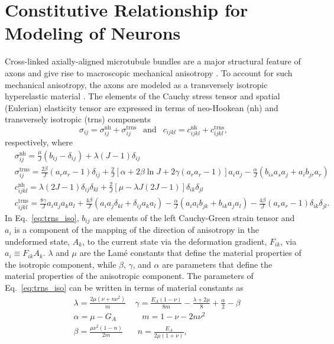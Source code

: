 \documentclass[]{interact}
\begin{document}
\section{Constitutive Relationship for Modeling of Neurons}
Cross-linked axially-aligned microtubule bundles are a major structural feature of axons and give rise to macroscopic mechanical anisotropy \citep{Peter:2012fc}. To account for such mechanical anisotropy, the axons are modeled as a transversely isotropic hyperelastic material \citep{Bonet:1998vc,JavierBonet:2008uxa}. The elements of the Cauchy stress tensor and spatial (Eulerian) elasticity tensor are expressed in terms of neo-Hookean (nh) and transversely isotropic (trns) components \citep{Bonet:1998vc}
%
\begin{equation}
\sigma_{ij} = \sigma^{\text{nh}}_{ij} + \sigma^{\text{trns}}_{ij} \ \ \text{ and } \ \ c_{ijkl} = c^{\text{nh}}_{ijkl} + c^{\text{trns}}_{ijkl},
\end{equation}
%
respectively, where 
%
\begin{align}
&\sigma^{\text{nh}}_{ij} = \frac{\mu}{J}(b_{ij} - \delta_{ij}) + \lambda(J-1)\delta_{ij} \nonumber\\
%
&\sigma^{\text{trns}}_{ij} = \frac{2\beta}{J}(a_r a_r - 1)\delta_{ij} + \frac{2}{J}[\alpha+2\beta\ln J+2\gamma(a_r a_r -1)]a_i a_j - \frac{\alpha}{J}(b_{is}a_s a_j+a_i b_{jr}a_r) \nonumber\\
%
&c^{\text{nh}}_{ijkl} = \lambda(2J-1)\delta_{ij}\delta_{kl} + \frac{2}{J}[\mu - \lambda J(2J-1)]\delta_{ik}\delta_{jl} \nonumber\\
%
&c^{\text{trns}}_{ijkl} = \frac{8\gamma}{J}a_i a_j a_k a_l + \frac{4\beta}{J}(a_i a_j \delta_{kl} + \delta_{ij}a_k a_l) - \frac{\alpha}{J}(a_i a_l b_{jk} + b_{ik}a_j a_l) - \frac{4\beta}{J}(a_r a_r - 1)\delta_{ik}\delta_{jl}.
\label{eq:trns_iso}
\end{align}
%
In Eq.\ \eqref{eq:trns_iso}, $b_{ij}$ are elements of the left Cauchy-Green strain tensor and $a_i$ is a component of the mapping of the direction of anisotropy in the undeformed state, $A_k$, to the current state via the deformation gradient, $F_{ik}$, via $a_i \equiv F_{ik}A_k$. $\lambda$ and $\mu$ are the Lam\'e constants that define the material properties of the isotropic component, while $\beta$, $\gamma$, and $\alpha$ are parameters that define the material properties of the anisotropic component. The parameters of Eq.\ \eqref{eq:trns_iso} can be written in terms of material constants as
%
\begin{align}
&\lambda = \frac{2\mu (\nu+n\nu^2)}{m} \ \ \ \ \ \gamma = \frac{E_A(1-\nu)}{8m} - \frac{\lambda+2\mu}{8} + \frac{\alpha}{2} - \beta \nonumber\\
%
&\alpha = \mu - G_A \ \ \ \ \ \ \ \ \ \ \ \ \ \ m = 1 - \nu - 2 n\nu^2 \nonumber\\
%
&\beta = \frac{\mu \nu^2(1-n)}{2m} \ \ \ \ \ \ \ \ n = \frac{E_A}{2\mu(1+\nu)},
\label{eq:trns_iso_constants}
\end{align}
\end{document}
